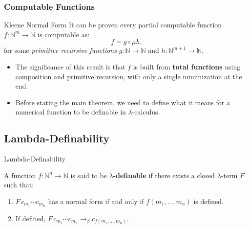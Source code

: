 \documentclass{beamer}
\begin{document}
\begin{frame}
  \frametitle{Computable Functions}
  \begin{block}{Kleene Normal Form}
    It can be proven every partial computable function \( f: \mathbb{N}^m \to \mathbb{N} \) is computable as:
    \[
      f = g \circ \mu h,
    \]
    for some \textit{primitive recursive functions} \( g: \mathbb{N} \to \mathbb{N} \) and \( h: \mathbb{N}^{m+1} \to \mathbb{N} \).
  \end{block}

  \begin{itemize}
    \item The significance of this result is that \( f \) is built from \textbf{total functions} using composition and primitive recursion, with only a single minimization at the end.
    \item Before stating the main theorem, we need to define what it means for a numerical function to be definable in \( \lambda \)-calculus.
  \end{itemize}

\end{frame}

\subsection{Lambda-Definability}
\begin{frame}{Lambda-Definability}
  \begin{definition}
    A function \(f: \mathbb{N}^n \to \mathbb{N}\) is said to be \textbf{\(\lambda\)-definable} if there exists a closed \(\lambda\)-term \(F\) such that:
    \begin{enumerate}
      \item \(F\,c_{m_1}\cdots c_{m_n}\) has a normal form if and only if \(f(m_1,\dots,m_n)\) is defined.
      \item If defined, \(F\,c_{m_1}\cdots c_{m_n} \rightarrow_\beta c_{f(m_1,\dots,m_n)}\).
    \end{enumerate}
  \end{definition}
\end{frame}
\end{document}
